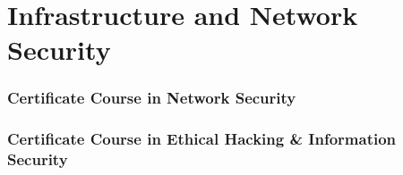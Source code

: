\section{Infrastructure and Network Security}
\begin{frame}
	\frametitle{Certificate Course in Network Security}
\end{frame}
\begin{frame}
	\frametitle{{\large Certificate Course in Ethical Hacking \& Information Security}}
\end{frame}